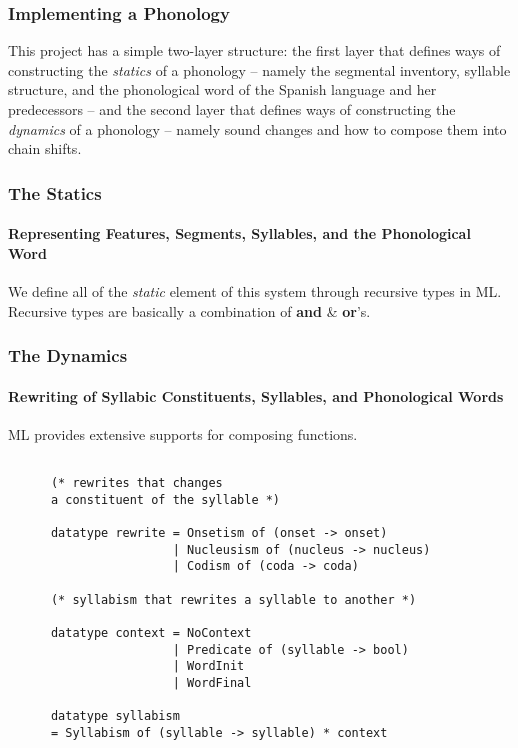 \documentclass{beamer}
\begin{document}
\begin{frame}
	\frametitle{Implementing a Phonology}

	This project has a simple two-layer structure: the first layer that defines ways of constructing the \emph{statics} of a phonology -- namely the segmental inventory, syllable structure, and the phonological word of the Spanish language and her predecessors -- and the second layer that defines ways of constructing the \emph{dynamics} of a phonology -- namely sound changes and how to compose them into chain shifts.
\end{frame}

\begin{frame}
	\frametitle{The Statics}
	\framesubtitle{Representing Features, Segments, Syllables, and the Phonological Word}

    We define all of the \emph{static} element of this system through recursive types in ML. \\
    Recursive types are basically a combination of \textbf{and} \& \textbf{or}'s.
\end{frame}

\begin{frame}
	\frametitle{The Dynamics}
	\framesubtitle{Rewriting of Syllabic Constituents, Syllables, and Phonological Words}

    ML provides extensive supports for composing functions.

\end{frame}

\begin{frame}[fragile]
    \begin{verbatim}
      
      (* rewrites that changes
      a constituent of the syllable *)

      datatype rewrite = Onsetism of (onset -> onset)
                       | Nucleusism of (nucleus -> nucleus)
                       | Codism of (coda -> coda)

      (* syllabism that rewrites a syllable to another *)

      datatype context = NoContext
                       | Predicate of (syllable -> bool)
                       | WordInit
                       | WordFinal

      datatype syllabism
      = Syllabism of (syllable -> syllable) * context

    \end{verbatim}
\end{frame}
\end{document}

